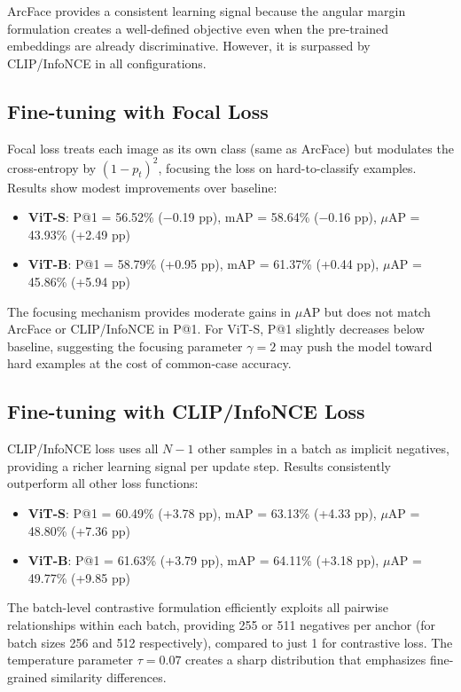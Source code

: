 \documentclass[
    english,
]{VUMIFPSbakalaurinis}
\begin{document}
ArcFace provides a consistent learning signal because the angular margin formulation creates a well-defined objective even when the pre-trained embeddings are already discriminative. However, it is surpassed by CLIP/InfoNCE in all configurations.

\subsection{Fine-tuning with Focal Loss}

Focal loss treats each image as its own class (same as ArcFace) but modulates the cross-entropy by $(1-p_t)^2$, focusing the loss on hard-to-classify examples. Results show modest improvements over baseline:
\begin{itemize}
    \item \textbf{ViT-S}: P@1 = 56.52\% ($-$0.19 pp), mAP = 58.64\% ($-$0.16 pp), $\mu$AP = 43.93\% (+2.49 pp)
    \item \textbf{ViT-B}: P@1 = 58.79\% (+0.95 pp), mAP = 61.37\% (+0.44 pp), $\mu$AP = 45.86\% (+5.94 pp)
\end{itemize}

The focusing mechanism provides moderate gains in $\mu$AP but does not match ArcFace or CLIP/InfoNCE in P@1. For ViT-S, P@1 slightly decreases below baseline, suggesting the focusing parameter $\gamma = 2$ may push the model toward hard examples at the cost of common-case accuracy.

\subsection{Fine-tuning with CLIP/InfoNCE Loss}

CLIP/InfoNCE loss uses all $N-1$ other samples in a batch as implicit negatives, providing a richer learning signal per update step. Results consistently outperform all other loss functions:
\begin{itemize}
    \item \textbf{ViT-S}: P@1 = 60.49\% (+3.78 pp), mAP = 63.13\% (+4.33 pp), $\mu$AP = 48.80\% (+7.36 pp)
    \item \textbf{ViT-B}: P@1 = 61.63\% (+3.79 pp), mAP = 64.11\% (+3.18 pp), $\mu$AP = 49.77\% (+9.85 pp)
\end{itemize}

The batch-level contrastive formulation efficiently exploits all pairwise relationships within each batch, providing 255 or 511 negatives per anchor (for batch sizes 256 and 512 respectively), compared to just 1 for contrastive loss. The temperature parameter $\tau = 0.07$ creates a sharp distribution that emphasizes fine-grained similarity differences.
\end{document}
